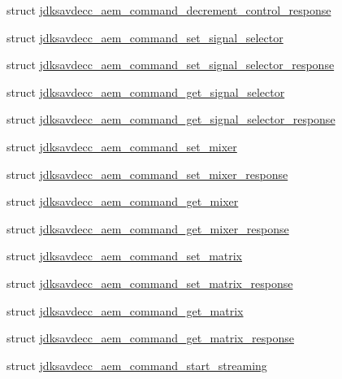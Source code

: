 \begin{DoxyCompactItemize}
\item 
struct \hyperlink{structjdksavdecc__aem__command__decrement__control__response}{jdksavdecc\+\_\+aem\+\_\+command\+\_\+decrement\+\_\+control\+\_\+response}
\item 
struct \hyperlink{structjdksavdecc__aem__command__set__signal__selector}{jdksavdecc\+\_\+aem\+\_\+command\+\_\+set\+\_\+signal\+\_\+selector}
\item 
struct \hyperlink{structjdksavdecc__aem__command__set__signal__selector__response}{jdksavdecc\+\_\+aem\+\_\+command\+\_\+set\+\_\+signal\+\_\+selector\+\_\+response}
\item 
struct \hyperlink{structjdksavdecc__aem__command__get__signal__selector}{jdksavdecc\+\_\+aem\+\_\+command\+\_\+get\+\_\+signal\+\_\+selector}
\item 
struct \hyperlink{structjdksavdecc__aem__command__get__signal__selector__response}{jdksavdecc\+\_\+aem\+\_\+command\+\_\+get\+\_\+signal\+\_\+selector\+\_\+response}
\item 
struct \hyperlink{structjdksavdecc__aem__command__set__mixer}{jdksavdecc\+\_\+aem\+\_\+command\+\_\+set\+\_\+mixer}
\item 
struct \hyperlink{structjdksavdecc__aem__command__set__mixer__response}{jdksavdecc\+\_\+aem\+\_\+command\+\_\+set\+\_\+mixer\+\_\+response}
\item 
struct \hyperlink{structjdksavdecc__aem__command__get__mixer}{jdksavdecc\+\_\+aem\+\_\+command\+\_\+get\+\_\+mixer}
\item 
struct \hyperlink{structjdksavdecc__aem__command__get__mixer__response}{jdksavdecc\+\_\+aem\+\_\+command\+\_\+get\+\_\+mixer\+\_\+response}
\item 
struct \hyperlink{structjdksavdecc__aem__command__set__matrix}{jdksavdecc\+\_\+aem\+\_\+command\+\_\+set\+\_\+matrix}
\item 
struct \hyperlink{structjdksavdecc__aem__command__set__matrix__response}{jdksavdecc\+\_\+aem\+\_\+command\+\_\+set\+\_\+matrix\+\_\+response}
\item 
struct \hyperlink{structjdksavdecc__aem__command__get__matrix}{jdksavdecc\+\_\+aem\+\_\+command\+\_\+get\+\_\+matrix}
\item 
struct \hyperlink{structjdksavdecc__aem__command__get__matrix__response}{jdksavdecc\+\_\+aem\+\_\+command\+\_\+get\+\_\+matrix\+\_\+response}
\item 
struct \hyperlink{structjdksavdecc__aem__command__start__streaming}{jdksavdecc\+\_\+aem\+\_\+command\+\_\+start\+\_\+streaming}
\item 

\end{DoxyCompactItemize}
